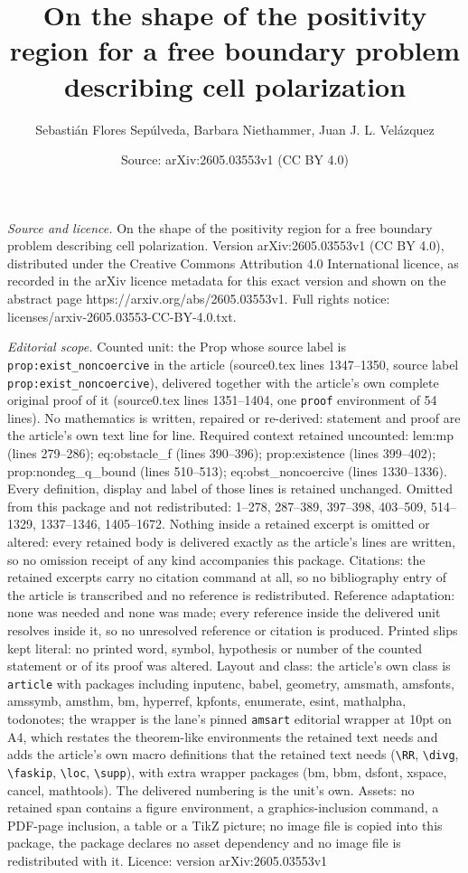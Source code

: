 \documentclass[10pt,a4paper]{amsart}
\title[On the shape of the positivity region for a free boundary pr]{On the shape of the positivity region for a free boundary problem describing cell polarization}
\author{Sebasti\'an Flores Sep\'ulveda, Barbara Niethammer, Juan J. L. Vel\'azquez}
\date{Source: arXiv:2605.03553v1 (CC BY 4.0)}
\begin{document}
\maketitle

\noindent\emph{Source and licence.} On the shape of the positivity region for a free boundary problem describing cell polarization. Version arXiv:2605.03553v1 (CC BY 4.0), distributed under the Creative Commons Attribution 4.0 International licence, as recorded in the arXiv licence metadata for this exact version and shown on the abstract page https://arxiv.org/abs/2605.03553v1. Full rights notice: licenses/arxiv-2605.03553-CC-BY-4.0.txt.\par\smallskip

\noindent\textit{Editorial scope.} Counted unit: the Prop whose source label is \texttt{prop:exist\_noncoercive} in the article (source0.tex lines 1347--1350, source label \texttt{prop:exist\_noncoercive}), delivered together with the article's own complete original proof of it (source0.tex lines 1351--1404, one \texttt{proof} environment of 54 lines). No mathematics is written, repaired or re-derived: statement and proof are the article's own text line for line. Required context retained uncounted: lem:mp (lines 279--286); eq:obstacle\_f (lines 390--396); prop:existence (lines 399--402); prop:nondeg\_q\_bound (lines 510--513); eq:obst\_noncoercive (lines 1330--1336). Every definition, display and label of those lines is retained unchanged. Omitted from this package and not redistributed: 1--278, 287--389, 397--398, 403--509, 514--1329, 1337--1346, 1405--1672. Nothing inside a retained excerpt is omitted or altered: every retained body is delivered exactly as the article's lines are written, so no omission receipt of any kind accompanies this package. Citations: the retained excerpts carry no citation command at all, so no bibliography entry of the article is transcribed and no reference is redistributed. Reference adaptation: none was needed and none was made; every reference inside the delivered unit resolves inside it, so no unresolved reference or citation is produced. Printed slips kept literal: no printed word, symbol, hypothesis or number of the counted statement or of its proof was altered. Layout and class: the article's own class is \texttt{article} with packages including inputenc, babel, geometry, amsmath, amsfonts, amssymb, amsthm, bm, hyperref, kpfonts, enumerate, esint, mathalpha, todonotes; the wrapper is the lane's pinned \texttt{amsart} editorial wrapper at 10pt on A4, which restates the theorem-like environments the retained text needs and adds the article's own macro definitions that the retained text needs (\texttt{\textbackslash RR}, \texttt{\textbackslash divg}, \texttt{\textbackslash faskip}, \texttt{\textbackslash loc}, \texttt{\textbackslash supp}), with extra wrapper packages (bm, bbm, dsfont, xspace, cancel, mathtools). The delivered numbering is the unit's own. Assets: no retained span contains a figure environment, a graphics-inclusion command, a PDF-page inclusion, a table or a TikZ picture; no image file is copied into this package, the package declares no asset dependency and no image file is redistributed with it. Licence: version arXiv:2605.03553v1 
\end{document}
